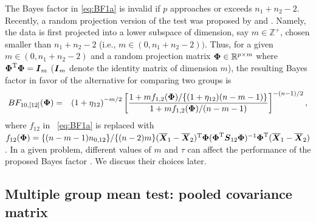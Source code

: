 \documentclass[alpha-refs]{wiley-article}
\theoremstyle{plain}%
\theoremstyle{definition}
\def\be{\begin{eqnarray}}
\def\ee{\end{eqnarray}}
\def\trans{^{\rm T}}
\newcommand{\uI}       {\mbox{\boldmath$I$}}
\newcommand{\uS}       {\mbox{\boldmath$S$}}
\newcommand{\uX}       {\mbox{\boldmath$X$}}
\newcommand{\uPhi}              {\mbox{\boldmath$\Phi$}}
\begin{document}
The Bayes factor in \eqref{eq:BF1a} is invalid if $p$ approaches or exceeds $n_1 + n_2 - 2$. Recently, a random projection version of the test was proposed by \cite{srivastava2014raptt} and \cite{zoh2018powerful}. Namely, the data is first projected into a lower subspace of dimension, say $m \in \mathbb{Z}^{+}$, chosen smaller than $n_1 + n_2 -2$ (i.e., $m \in (0, n_1 + n_2 - 2))$. Thus, for a given $m \in (0, n_1 + n_2 - 2)$ and a random projection matrix $\uPhi \in \mathbb{R}^{p \times m}$ where $\uPhi\trans\uPhi = \uI_{m}$ ($\uI_{m}$ denote the identity matrix of dimension $m$), the resulting Bayes factor in favor of the alternative for comparing two groups is 
\be
BF_{10,[12]}(\uPhi) &=& \left(1 + \eta_{12} \right)^{-m/2} \left[\frac{  1 + {m f_{1,2}(\uPhi)}/\{(1 + \eta_{12})(n-m-1)\}}{ 1 + {m f_{1,2}(\uPhi)}/{(n-m-1)}  } \right]^{-(n-1)/2}, \label{eq:BF1}
\ee
where $f_{12}$ in ~\eqref{eq:BF1a} is replaced with $f_{12}(\uPhi) = \{(n-m-1)n_{0,12} \}/\{(n-2)m\} (\overline{\uX}_1 - \overline{\uX}_2)\trans\uPhi(\uPhi\trans\uS_{12}\uPhi)^{-1}\uPhi\trans(\overline{\uX}_1 - \overline{\uX}_2)$. 
In a given problem, different values of $m$ and $\tau$ can affect the performance of the proposed Bayes factor \citep{zoh2018powerful}. We discuss their choices later. 

\subsection{Multiple group mean test: pooled covariance matrix} \label{sec:testpl}
\end{document}
